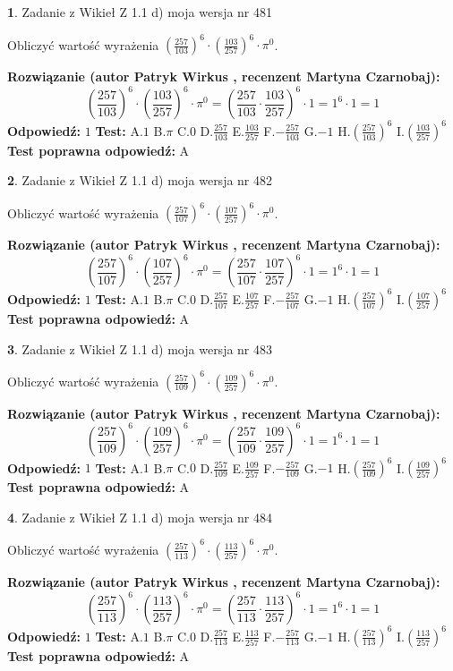 \documentclass[12pt, a4paper]{article}
\theoremstyle{definition} %
\newtheorem{zad}{}
\newcommand{\zadStart}[1]{\begin{zad}#1\newline}
\newcommand{\zadStop}{\end{zad}}
\newcommand{\rozwStart}[2]{\noindent \textbf{Rozwiązanie (autor #1 , recenzent #2): }\newline}
\newcommand{\rozwStop}{\newline}
\newcommand{\odpStart}{\noindent \textbf{Odpowiedź:}\newline}
\newcommand{\odpStop}{\newline}
\newcommand{\testStart}{\noindent \textbf{Test:}\newline}
\newcommand{\testStop}{\newline}
\newcommand{\kluczStart}{\noindent \textbf{Test poprawna odpowiedź:}\newline}
\newcommand{\kluczStop}{\newline}
\begin{document}
\zadStart{Zadanie z Wikieł Z 1.1 d) moja wersja nr 481}

Obliczyć wartość wyrażenia $(\frac{257}{103})^{6} \cdot (\frac{103}{257})^{6} \cdot \pi^{0}$.
\zadStop
\rozwStart{Patryk Wirkus}{Martyna Czarnobaj}
$$(\frac{257}{103})^{6} \cdot (\frac{103}{257})^{6} \cdot \pi^{0} = (\frac{257}{103} \cdot \frac{103}{257})^{6} \cdot 1 = 1^{6} \cdot 1 = 1$$
\rozwStop
\odpStart
$1$
\odpStop
\testStart
A.$1$ B.$\pi$ C.$0$ D.$\frac{257}{103}$ E.$\frac{103}{257}$
F.$-\frac{257}{103}$ G.$-1$
H.$(\frac{257}{103})^{6}$
I.$(\frac{103}{257})^{6}$
\testStop
\kluczStart
A
\kluczStop



\zadStart{Zadanie z Wikieł Z 1.1 d) moja wersja nr 482}

Obliczyć wartość wyrażenia $(\frac{257}{107})^{6} \cdot (\frac{107}{257})^{6} \cdot \pi^{0}$.
\zadStop
\rozwStart{Patryk Wirkus}{Martyna Czarnobaj}
$$(\frac{257}{107})^{6} \cdot (\frac{107}{257})^{6} \cdot \pi^{0} = (\frac{257}{107} \cdot \frac{107}{257})^{6} \cdot 1 = 1^{6} \cdot 1 = 1$$
\rozwStop
\odpStart
$1$
\odpStop
\testStart
A.$1$ B.$\pi$ C.$0$ D.$\frac{257}{107}$ E.$\frac{107}{257}$
F.$-\frac{257}{107}$ G.$-1$
H.$(\frac{257}{107})^{6}$
I.$(\frac{107}{257})^{6}$
\testStop
\kluczStart
A
\kluczStop



\zadStart{Zadanie z Wikieł Z 1.1 d) moja wersja nr 483}

Obliczyć wartość wyrażenia $(\frac{257}{109})^{6} \cdot (\frac{109}{257})^{6} \cdot \pi^{0}$.
\zadStop
\rozwStart{Patryk Wirkus}{Martyna Czarnobaj}
$$(\frac{257}{109})^{6} \cdot (\frac{109}{257})^{6} \cdot \pi^{0} = (\frac{257}{109} \cdot \frac{109}{257})^{6} \cdot 1 = 1^{6} \cdot 1 = 1$$
\rozwStop
\odpStart
$1$
\odpStop
\testStart
A.$1$ B.$\pi$ C.$0$ D.$\frac{257}{109}$ E.$\frac{109}{257}$
F.$-\frac{257}{109}$ G.$-1$
H.$(\frac{257}{109})^{6}$
I.$(\frac{109}{257})^{6}$
\testStop
\kluczStart
A
\kluczStop



\zadStart{Zadanie z Wikieł Z 1.1 d) moja wersja nr 484}

Obliczyć wartość wyrażenia $(\frac{257}{113})^{6} \cdot (\frac{113}{257})^{6} \cdot \pi^{0}$.
\zadStop
\rozwStart{Patryk Wirkus}{Martyna Czarnobaj}
$$(\frac{257}{113})^{6} \cdot (\frac{113}{257})^{6} \cdot \pi^{0} = (\frac{257}{113} \cdot \frac{113}{257})^{6} \cdot 1 = 1^{6} \cdot 1 = 1$$
\rozwStop
\odpStart
$1$
\odpStop
\testStart
A.$1$ B.$\pi$ C.$0$ D.$\frac{257}{113}$ E.$\frac{113}{257}$
F.$-\frac{257}{113}$ G.$-1$
H.$(\frac{257}{113})^{6}$
I.$(\frac{113}{257})^{6}$
\testStop
\kluczStart
A
\kluczStop
\end{document}
